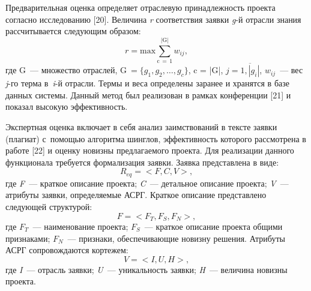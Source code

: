 Предварительная оценка определяет отраслевую принадлежность проекта согласно исследованию [20]. Величина \textit{r} соответствия заявки \textit{g}-й отрасли знания рассчитывается следующим образом:
\begin{equation}
  r = \text{max}\sum_{\text{c}\,=\,1}^{|\text{G}|}{w_{ij}},
\end{equation}
где G~--- множество отраслей, $\text{G}~= \{g_1, g_2,\dots, g_c \}$, c = |G|, $j=\overline{1,|g_i|}$, $w_{ij}$~--- вес \textit{j}-го терма в~\textit{i}-й отрасли. Термы и веса определены заранее и хранятся в базе данных системы. Данный метод был реализован в рамках конференции [21] и показал высокую эффективность.



Экспертная оценка включает в себя анализ заимствований в тексте заявки (плагиат) с~помощью алгоритма шинглов, эффективность которого рассмотрена в работе [22] и оценку новизны предлагаемого проекта. Для реализации данного функционала требуется формализация заявки. Заявка представлена в виде:
\begin{equation}
  R_{eq}= < F, C, V >,
\end{equation}
где \textit{F}~--- краткое описание проекта; \textit{C}~--- детальное описание проекта; \textit{V}~--- атрибуты заявки, определяемые АСРГ. Краткое описание представлено следующей структурой:
\begin{equation}
  F = < F_T, F_S, F_N >,
\end{equation}
где $F_T$~--- наименование проекта; $F_S$~--- краткое описание проекта общими признаками; $F_N$~--- признаки, обеспечивающие новизну решения. Атрибуты АСРГ сопровождаются кортежем:
\begin{equation}
  V = < I, U, H >,
\end{equation}
где \textit{I}~--- отрасль заявки; \textit{U}~--- уникальность заявки; \textit{H}~--- величина новизны проекта.

